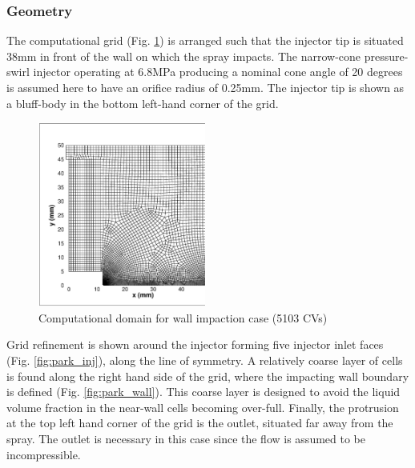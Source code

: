 \documentclass[a4paper,10pt]{article}
\begin{document}
\subsubsection{Geometry}
The computational grid (Fig. \ref{fig:park_grid}) is arranged such that the injector tip is situated 38mm in front of the wall on which the spray impacts. The narrow-cone pressure-swirl injector operating at 6.8MPa producing a nominal cone angle of 20 degrees is assumed here to have an orifice radius of 0.25mm. The injector tip is shown as a bluff-body in the bottom left-hand corner of the grid.
\begin{figure}[H]
\centering
\includegraphics[width=0.49\textwidth]{grid.eps}
\caption{Computational domain for wall impaction case (5103 CVs)}
\label{fig:park_grid}
\end{figure}
Grid refinement is shown around the injector forming five injector inlet faces (Fig. \ref{fig:park_inj}), along the line of symmetry. A relatively coarse layer of cells is found along the right hand side of the grid, where the impacting wall boundary is defined (Fig. \ref{fig:park_wall}). This coarse layer is designed to avoid the liquid volume fraction in the near-wall cells becoming over-full. Finally, the protrusion at the top left hand corner of the grid is the outlet, situated far away from the spray. The outlet is necessary in this case since the flow is assumed to be incompressible.
\end{document}

